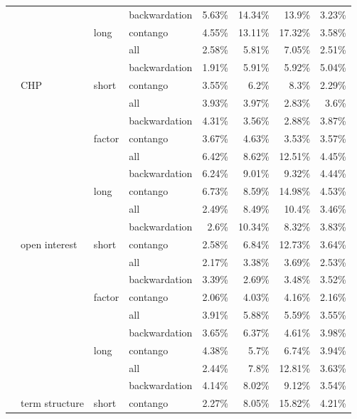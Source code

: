 \documentclass[]{elsarticle} %
\begin{document}
\begin{longtable}[t]{>{}llllrrrr}
\nopagebreak
 &  &  & backwardation & 5.63\% & 14.34\% & 13.9\% & 3.23\%\\
\nopagebreak
 &  & \multirow[t]{-3}{*}{\raggedright\arraybackslash long} & contango & 4.55\% & 13.11\% & 17.32\% & 3.58\%\\
\nopagebreak
 &  &  & all & 2.58\% & 5.81\% & 7.05\% & 2.51\%\\
\nopagebreak
 &  &  & backwardation & 1.91\% & 5.91\% & 5.92\% & 5.04\%\\
\nopagebreak
 & \multirow[t]{-9}{*}{\raggedright\arraybackslash CHP} & \multirow[t]{-3}{*}{\raggedright\arraybackslash short} & contango & 3.55\% & 6.2\% & 8.3\% & 2.29\%\\
\nopagebreak
 &  &  & all & 3.93\% & 3.97\% & 2.83\% & 3.6\%\\
\nopagebreak
 &  &  & backwardation & 4.31\% & 3.56\% & 2.88\% & 3.87\%\\
\nopagebreak
 &  & \multirow[t]{-3}{*}{\raggedright\arraybackslash factor} & contango & 3.67\% & 4.63\% & 3.53\% & 3.57\%\\
\nopagebreak
 &  &  & all & 6.42\% & 8.62\% & 12.51\% & 4.45\%\\
\nopagebreak
 &  &  & backwardation & 6.24\% & 9.01\% & 9.32\% & 4.44\%\\
\nopagebreak
 &  & \multirow[t]{-3}{*}{\raggedright\arraybackslash long} & contango & 6.73\% & 8.59\% & 14.98\% & 4.53\%\\
\nopagebreak
 &  &  & all & 2.49\% & 8.49\% & 10.4\% & 3.46\%\\
\nopagebreak
 &  &  & backwardation & 2.6\% & 10.34\% & 8.32\% & 3.83\%\\
\nopagebreak
 & \multirow[t]{-9}{*}{\raggedright\arraybackslash open interest} & \multirow[t]{-3}{*}{\raggedright\arraybackslash short} & contango & 2.58\% & 6.84\% & 12.73\% & 3.64\%\\
\nopagebreak
 &  &  & all & 2.17\% & 3.38\% & 3.69\% & 2.53\%\\
\nopagebreak
 &  &  & backwardation & 3.39\% & 2.69\% & 3.48\% & 3.52\%\\
\nopagebreak
 &  & \multirow[t]{-3}{*}{\raggedright\arraybackslash factor} & contango & 2.06\% & 4.03\% & 4.16\% & 2.16\%\\
\nopagebreak
 &  &  & all & 3.91\% & 5.88\% & 5.59\% & 3.55\%\\
\nopagebreak
 &  &  & backwardation & 3.65\% & 6.37\% & 4.61\% & 3.98\%\\
\nopagebreak
 &  & \multirow[t]{-3}{*}{\raggedright\arraybackslash long} & contango & 4.38\% & 5.7\% & 6.74\% & 3.94\%\\
\nopagebreak
 &  &  & all & 2.44\% & 7.8\% & 12.81\% & 3.63\%\\
\nopagebreak
 &  &  & backwardation & 4.14\% & 8.02\% & 9.12\% & 3.54\%\\
\nopagebreak
\multirow[t]{-30}{*}{\raggedright\arraybackslash \textbf{term structure}} & \multirow[t]{-9}{*}{\raggedright\arraybackslash term structure} & \multirow[t]{-3}{*}{\raggedright\arraybackslash short} & contango & 2.27\% & 8.05\% & 15.82\% & 4.21\%\\*
\end{longtable}
\endgroup{}
\end{document}
